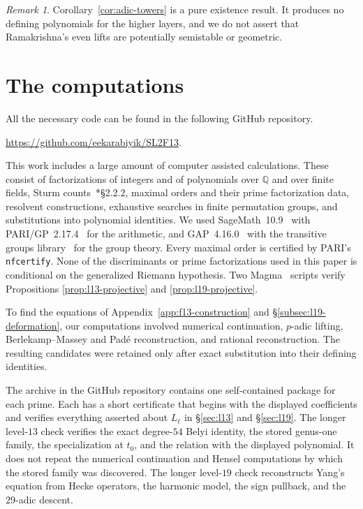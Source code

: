 \documentclass[10pt]{amsart}
\numberwithin{equation}{section}
\theoremstyle{definition}
\theoremstyle{remark}
\newtheorem{remark}[theorem]{Remark}
\newcommand{\Q}{\mathbb{Q}}
\begin{document}
\begin{remark}
Corollary~\ref{cor:adic-towers} is a pure existence result.  It produces no defining
polynomials for the higher layers, and we do not assert that Ramakrishna's
even lifts are potentially semistable or geometric.
\end{remark}

\section{The computations}\label{sec:computations}


All the necessary code can be found in the following GitHub repository.
\begin{center}
    \href{https://github.com/eekarabiyik/SL2F13}{https://github.com/eekarabiyik/SL2F13}.
\end{center}

This work includes a large amount of computer assisted calculations. These consist of factorizations
of integers and of polynomials over $\Q$ and over finite fields, Sturm
counts~\cite{BasuPollackRoy2006}*{\S2.2.2}, maximal orders and their prime factorization data, resolvent
constructions, exhaustive searches in finite permutation groups, and
substitutions into polynomial identities. 
We used SageMath~10.9~\cite{SageMath} with PARI/GP~2.17.4~\cite{PARI2} for the
arithmetic, and GAP~4.16.0~\cite{GAP} with the transitive groups
library~\cite{TransGrp} for the group theory.  Every maximal order is
certified by PARI's \texttt{nfcertify}. None of the discriminants or
prime factorizations used in this paper is conditional on the generalized Riemann
hypothesis.  Two Magma~\cite{Magma} scripts verify Propositions \ref{prop:l13-projective} and \ref{prop:l19-projective}.

To find the equations of
Appendix~\ref{app:f13-construction} and \S\ref{subsec:l19-deformation}, our computations 
involved numerical continuation, $p$-adic lifting, Berlekamp--Massey and
Pad\'e reconstruction, and rational reconstruction. The resulting candidates
were retained only after exact substitution into their defining identities.

The archive in the GitHub repository contains one self-contained package for each prime.  Each has a short certificate that begins with the displayed coefficients and verifies everything asserted about $L_\ell$ in \S\ref{sec:l13} and
\S\ref{sec:l19}.  The longer level-$13$ check verifies the exact degree-$54$ Belyi identity, the stored genus-one family, the specialization at $t_0$, and the relation with the displayed polynomial.  It does not repeat the numerical continuation and Hensel computations by which the stored family was discovered.  The longer level-$19$ check reconstructs Yang's equation from Hecke operators, the harmonic model, the sign pullback, and the $29$-adic descent.
\end{document}
